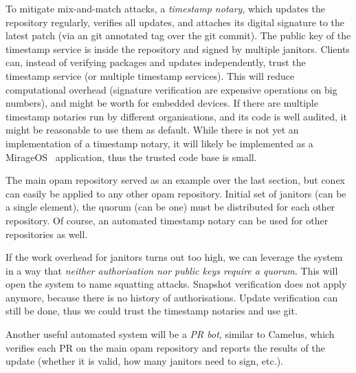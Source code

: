 \documentclass[nocopyrightspace]{sigplanconf}
\newcommand{\TODO}[1]{\textbf{[TODO: #1]}}
\begin{document}

To mitigate mix-and-match attacks, a \emph{timestamp notary}, which updates the repository regularly, verifies all updates, and attaches its digital signature to the latest patch (via an git annotated tag over the git commit).
The public key of the timestamp service is inside the repository and signed by multiple janitors.
Clients can, instead of verifying packages and updates independently, trust the timestamp service (or multiple timestamp services).
This will reduce computational overhead (signature verification are expensive operations on big numbers), and might be worth for embedded devices.
If there are multiple timestamp notaries run by different organisations, and its code is well audited, it might be reasonable to use them as default.
While there is not yet an implementation of a timestamp notary, it will likely be implemented as a MirageOS~\cite{mirage,nqsb-tls} application, thus the trusted code base is small.

The main opam repository served as an example over the last section, but conex can easily be applied to any other opam repository.
Initial set of janitors (can be a single element), the quorum (can be one) must be distributed for each other repository.
Of course, an automated timestamp notary can be used for other repositories as well.

If the work overhead for janitors turns out too high, we can leverage the system in a way that \emph{neither authorisation nor public keys require a quorum}.
This will open the system to name squatting attacks.
Snapshot verification does not apply anymore, because there is no history of authorisations.
Update verification can still be done, thus we could trust the timestamp notaries and use git.


Another useful automated system will be a \emph{PR bot}, similar to Camelus, which verifies each PR on the main opam repository and reports the results of the update (whether it is valid, how many janitors need to sign, etc.).
\end{document}
